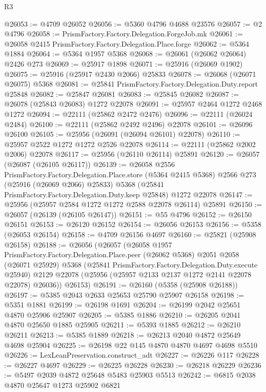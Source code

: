 \begin{lexlean}{R3}
\begin{coremodule}
@26053 := @4709 @26052
@26056 := @5360 @4796 @4688 @23576
@26057 := @2 @4796
@26058 := PrismFactory.Factory.Delegation.ForgeJob.mk
@26061 := @26058 @2415 PrismFactory.Factory.Delegation.Place.forge
@26062 := @5364 @1884
@26064 := @5364 @1957 @5368
@26068 := @26061 (@26062 @26064) @2426 @273
@26069 := @25917 @1898
@26071 := @25916 (@26069 @1902)
@26075 := @25916 (@25917 @2430 @2066) @25833
@26078 := @26068 (@26071 @26075) @5368
@26081 := @25841 PrismFactory.Factory.Delegation.Duty.report @25848
@26082 := @25847 @26081
@26083 := @25845 @26082
@26087 := @26078 (@25843 @26083) @1272 @22078
@26091 := @25957 @2464 @1272 @2468 @1272
@26094 := @22111 (@25862 @2472 @2476)
@26096 := @22111 (@26024 @2484)
@26100 := @22111 (@25862 @2492 @2496) @22078
@26101 := @26096 @26100
@26105 := @25956 (@26091 (@26094 @26101) @22078)
@26110 := @25957 @2522 @1272 @1272 @2526 @22078
@26114 := @22111 (@25862 @2002 @2006) @22078
@26117 := @25956 (@26110 @26114) @25891
@26120 := @26057 (@26087 (@26105 @26117))
@26139 := @26058
    @2556
    PrismFactory.Factory.Delegation.Place.store
    (@5364 @2415 @5368)
    @2566
    @273
    (@25916 (@26069 @2066) @25833)
    @5368
    (@25841 PrismFactory.Factory.Delegation.Duty.keep @25848)
    @1272
    @22078
@26147 := @25956 (@25957 @2584 @1272 @1272 @2588 @22078 @26114) @25891
@26150 := @26057 (@26139 (@26105 @26147))
@26151 := @55 @4796
@26152 := @26150 @26151
@26153 := @26120 @26152
@26154 := @26056 @26153
@26156 := @5358 (@26053 @26154)
@26158 := @4709 @26156 @4697
@26160 := @25821 (@25908 @26158)
@26188 := @26056
    (@26057
      (@26058
        @1957
        PrismFactory.Factory.Delegation.Place.peer
        (@26062 @5368)
        @2051
        @2058
        (@26071 @25929)
        @5368
        (@25841 PrismFactory.Factory.Delegation.Duty.execute @25940)
        @2129
        @22078
        (@25956 (@25957 @2133 @2137 @1272 @2141 @22078 @22078) @26036))
      @26153)
@26191 := @26160 (@5358 (@25908 @26188))
@26197 := @5385 @2043 @2633 @25653 @25790 @25907 @26158
@26198 := @5351 @1881
@26199 := @26198 @1691
@26204 := @26199 @2042 @25651 @4870 @25906 @25907
@26205 := @5385 @1886
@26210 := @26205 @2041 @4870 @25650 @1885 @25905
@26211 := @5393 @1885
@26212 := @26210 @26211
@26213 := @5385 @1889
@26218 := @26213 @2040 @4872 @25649 @4698 @25904
@26225 := @26198 @22 @145 @4870 @4870 @4697 @4698 @5510
@26226 := LexLeanPreservation.construct_adt
@26227 := @26226 @117
@26228 := @26227 @4697
@26229 := @26225 @26228
@26230 := @26218 @26229
@26236 := @5497 @2039 @4872 @25648 @5483 @25903 @5513
@26242 := @6815 @2038 @4870 @25647 @1273 @25902 @6821

\end{coremodule}
\end{lexlean}
